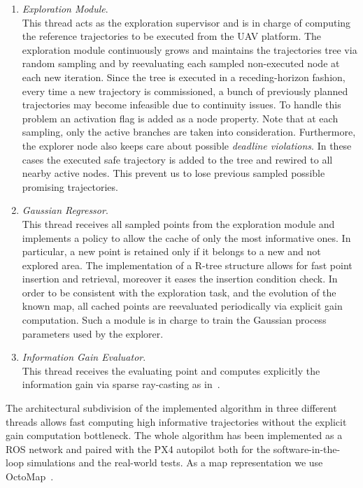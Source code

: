 \begin{enumerate}
	\item \emph{Exploration Module}.\\
	This thread acts as the exploration supervisor and is in charge of computing the reference trajectories to be executed from
	the UAV platform. The exploration module continuously grows and maintains the trajectories tree via random sampling and by
	reevaluating each sampled non-executed node at each new iteration. Since the tree is executed in a receding-horizon fashion,
	every time a new trajectory is commissioned, a bunch of previously planned trajectories may become infeasible due to continuity
	issues. To handle this problem an activation flag is added as a node property. Note that at each sampling, only the active branches
	are taken into consideration. Furthermore, the explorer node also keeps care about possible \emph{deadline violations}.
	In these cases the executed safe trajectory is added to the tree and rewired to all nearby active nodes.
	This prevent us to lose previous sampled possible promising trajectories.
	\item \emph{Gaussian Regressor}.\\
	This thread receives all sampled points from the exploration module and implements a policy to allow the cache of only the most
	informative ones. In particular, a new point is retained only if it belongs to a new and not explored area. The implementation of a
	R-tree structure allows for fast point insertion and retrieval, moreover it eases the insertion condition check. In order to be
	consistent with the exploration task, and the evolution of the known map, all cached points are reevaluated periodically via
	explicit gain computation. Such a module is in charge to train the Gaussian process parameters used by the explorer.
	\item \emph{Information Gain Evaluator}.\\
	This thread receives the evaluating point and computes explicitly the information gain via sparse ray-casting as in~\cite{selin2019efficient}.
\end{enumerate}
The architectural subdivision of the implemented algorithm in three different threads allows fast computing high informative trajectories
without the explicit gain computation bottleneck. The whole algorithm has been implemented as a ROS network and paired with the PX4
autopilot both for the software-in-the-loop simulations and the real-world tests. As a map representation we use OctoMap~\cite{hornung2013octomap}.
